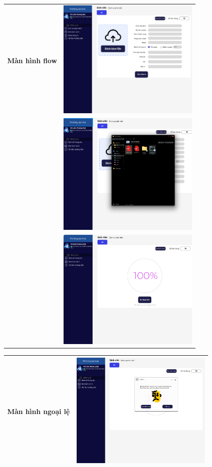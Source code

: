 \documentclass[a4paper]{article}
\begin{document}
\begin{table}[h!]
\centering
\begin{tabular}{|c|c|}
\hline
\textbf{Màn hình flow} & \includegraphics[width=7cm]{picture/pic1-1.png} \\ & \includegraphics[width=7cm]{picture/pic2-2.png}\\ & \includegraphics[width=7cm]{picture/pic3-3.png}\\
\hline
\end{tabular}
\end{table}
\newpage
\begin{table}[h!]
\centering
\begin{tabular}{|c|c|}
\hline
\textbf{Màn hình ngoại lệ} & \includegraphics[width=7cm]{picture/pic4-4.png} \\ 
\hline
\end{tabular}
\end{table}
\end{document}
